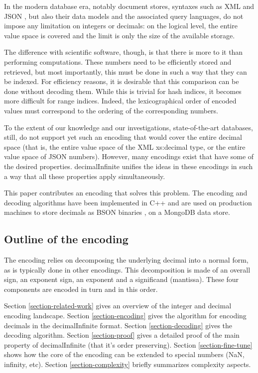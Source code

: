 \documentclass{acm_proc_article-sp}
\begin{document}
In the modern database era, notably document stores, syntaxes such as XML \cite{XML} and JSON \cite{JSON}, but also their data models and the associated query languages, do not impose any limitation on integers or decimals: on the logical level, the entire value space is covered and the limit is only the size of the available storage.

The difference with scientific software, though, is that there is more to it than performing computations. These numbers need to be efficiently stored and retrieved, but most importantly, this must be done in such a way that they can be indexed. For efficiency reasons, it is desirable that this comparison can be done without decoding them. While this is trivial for hash indices, it becomes more difficult for range indices. Indeed, the lexicographical order of encoded values must correspond to the ordering of the corresponding numbers.

To the extent of our knowledge and our investigations, state-of-the-art databases, still, do not support yet such an encoding that would cover the entire decimal space (that is, the entire value space of the XML xs:decimal type, or the entire value space of JSON numbers). However, many encodings exist that have some of the desired properties. decimalInfinite unifies the ideas in these encodings in such a way that all these properties apply simultaneously.

This paper contributes an encoding that solves this problem. The encoding and decoding algorithms have been implemented in C++ and are used on production machines to store decimals as BSON binaries \cite{BSON}, on a MongoDB \cite{MongoDB} data store.

\subsection{Outline of the encoding}

The encoding relies on decomposing the underlying decimal into a normal form, as is typically done in other encodings. This decomposition is made of an overall sign, an exponent sign, an exponent and a significand (mantissa). These four components are encoded in turn and in this order.

Section \ref{section-related-work} gives an overview of the integer and decimal encoding landscape.
Section \ref{section-encoding} gives the algorithm for encoding decimals in the decimalInfinite format.
Section \ref{section-decoding} gives the decoding algorithm.
Section \ref{section-proof} gives a detailed proof of the main property of decimalInfinite (that it's order preserving).
Section \ref{section-fine-tune} shows how the core of the encoding can be extended to special numbers (NaN, infinity, etc).
Section \ref{section-complexity} briefly summarizes complexity aspects.
\end{document}
